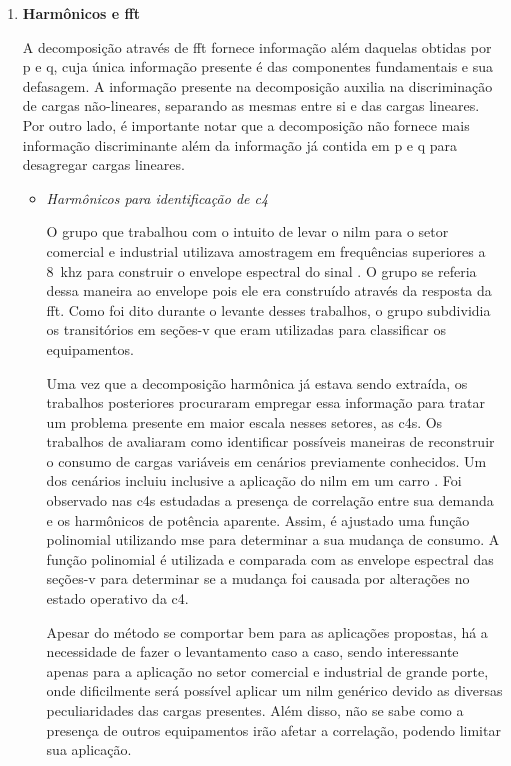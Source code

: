 \begin{enumerate}[label=\textbf{2.\arabic*},wide=\parindent]
\item \textbf{Harmônicos e \gls{fft}}
\label{nilm:harmonic_fft}

A decomposição através de \gls{fft} fornece informação além daquelas
obtidas por \gls{p} e \gls{q}, cuja única informação presente é das
componentes fundamentais e sua defasagem. A informação presente na
decomposição auxilia na discriminação de cargas não-lineares,
separando as mesmas entre si e das cargas lineares. Por outro lado, é
importante notar que a decomposição não fornece mais informação
discriminante além da informação já contida em \gls{p} e \gls{q} para
desagregar cargas lineares.

\begin{itemize}[wide=\parindent]
\item \emph{Harmônicos para identificação de \acs{c4}}

O grupo que trabalhou com o intuito de levar o \gls{nilm} para o setor
comercial e industrial \cite{nilm_norford_leeb_medianfilt_1996_13,
nilm_leeb_spectral_envelope_1995_23} utilizava amostragem em
frequências superiores a 8~k\acs{hz} para construir o envelope
espectral do sinal \cite{nilm_laughman_continuous_variables_2003_9}. O
grupo se referia dessa maneira ao envelope pois ele era construído
através da resposta da \gls{fft}. Como foi dito durante o levante
desses trabalhos, o grupo subdividia os transitórios em seções-v que
eram utilizadas para classificar os equipamentos. 

Uma vez que a decomposição harmônica já estava sendo extraída, os
trabalhos posteriores procuraram empregar essa informação para tratar
um problema presente em maior escala nesses setores, as \glspl{c4}.
Os trabalhos de \citet{nilm_lee_variable_speed_estimation_2005_24,
nilm_wichakool_2009_25,nilm_shaw_2008_26} avaliaram como identificar
possíveis maneiras de reconstruir o consumo de cargas variáveis
em cenários previamente conhecidos. Um dos cenários incluiu inclusive
a aplicação do \gls{nilm} em um carro \cite{nilm_shaw_2008_26}.
Foi observado nas \glspl{c4} estudadas a presença de correlação entre
sua demanda e os harmônicos de potência aparente. Assim, é ajustado
uma função polinomial utilizando \gls{mse} para determinar a sua
mudança de consumo. A função polinomial é utilizada e comparada com as
envelope espectral das seções-v para determinar se a mudança foi
causada por alterações no estado operativo da \gls{c4}.

Apesar do método se comportar bem para as aplicações propostas,
há a necessidade de fazer o levantamento caso a caso, sendo
interessante apenas para a aplicação no setor comercial e industrial
de grande porte, onde dificilmente será possível aplicar um \gls{nilm}
genérico devido as diversas peculiaridades das cargas presentes. Além
disso, não se sabe como a presença de outros equipamentos irão afetar a
correlação, podendo limitar sua aplicação.


\end{itemize}
\end{enumerate}
